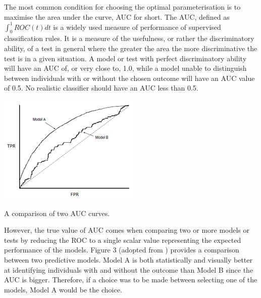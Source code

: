 \documentclass[a4paper,justified]{tufte-handout}
\begin{document}
\begin{fullwidth}
\noindent The most common condition for choosing the optimal parameterisation is to maximise the area under the curve, AUC for short. The AUC, defined as $\int_{0}^{1} ROC(t) dt$ is a widely used measure of performance of supervised classification rules. It is a measure of the usefulness, or rather the discriminatory ability, of a test in general where the greater the area the more discriminative the test is in a given situation. A model or test with perfect discriminatory ability will have an AUC of, or very close to, 1.0, while a model unable to distinguish between individuals with or without the chosen outcome will have an AUC value of 0.5.  No realistic classifier should have an AUC less than 0.5. 

\end{fullwidth}

\begin{marginfigure}[6.0cm]
	\includegraphics[width=\linewidth]{roc_curves/Figure3.png}
	\caption{A comparison of two AUC curves.}
\end{marginfigure}

\vspace{3mm}
\noindent However, the true value of AUC comes when comparing two or more models or tests by reducing the ROC to a single scalar value representing the expected performance of the models. Figure 3 (adopted from \citep{linden2006diagpreddismgmt}) provides a comparison between two predictive models. Model A is both statistically and visually better at identifying individuals with and without the outcome than Model B since the AUC is bigger. Therefore, if a choice was to be made between selecting one of the models, Model A would be the choice.
\end{document}

